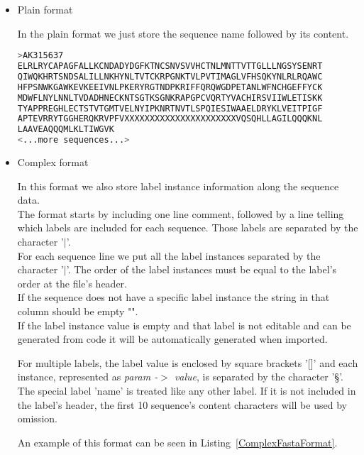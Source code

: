 \begin{itemize}
  \item Plain format
  
  In the plain format we just store the sequence name followed by its content.
  
\begin{lstlisting}[float, language=bash,frame=single,caption={Plain FASTA format.}]
>AK315637
ELRLRYCAPAGFALLKCNDADYDGFKTNCSNVSVVHCTNLMNTTVTTGLLLNGSYSENRT
QIWQKHRTSNDSALILLNKHYNLTVTCKRPGNKTVLPVTIMAGLVFHSQKYNLRLRQAWC
HFPSNWKGAWKEVKEEIVNLPKERYRGTNDPKRIFFQRQWGDPETANLWFNCHGEFFYCK
MDWFLNYLNNLTVDADHNECKNTSGTKSGNKRAPGPCVQRTYVACHIRSVIIWLETISKK
TYAPPREGHLECTSTVTGMTVELNYIPKNRTNVTLSPQIESIWAAELDRYKLVEITPIGF
APTEVRRYTGGHERQKRVPFVXXXXXXXXXXXXXXXXXXXXXXVQSQHLLAGILQQQKNL
LAAVEAQQQMLKLTIWGVK
<...more sequences...>
\end{lstlisting}
  
  \item Complex format
  
  In this format we also store label instance information along the sequence data. \\
  
  The format starts by including one line comment, followed by a line telling which labels are included for each sequence. Those labels are separated by the character '$|$'.\\
  
  For each sequence line we put all the label instances separated by the character '$|$'. The order of the label instances must be equal to the label's order at the file's header.\\
  
  If the sequence does not have a specific label instance the string in that column should be empty "".\\
  
  If the label instance value is empty and that label is not editable and can be generated from code it will be automatically generated when imported.
  
  For multiple labels, the label value is enclosed by square brackets '[]' and each instance, represented as \textit{param -$>$ value}, is separated by the character '§'.\\
  
  The special label 'name' is treated like any other label. If it is not included in the label's header, the
  first 10 sequence's content characters will be used by omission.
  
  An example of this format can be seen in Listing~\ref{ComplexFastaFormat}.\\
  

\end{itemize}
